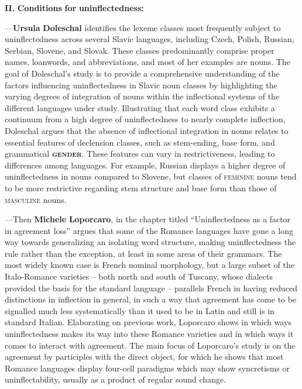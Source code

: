\documentclass[output=paper]{langscibook}
\begin{document}
\textbf{II.} \textbf{Conditions} \textbf{for} \textbf{uninflectedness:} 

—\textbf{Ursula} \textbf{Doleschal} identifies the lexeme classes most frequently subject to uninflectedness across several Slavic languages, including Czech, Polish, Russian, Serbian, Slovene, and Slovak. These classes predominantly comprise proper names, loanwords, and abbreviations, and most of her examples are nouns. The goal of Doleschal’s study is to provide a comprehensive understanding of the factors influencing uninflectedness in Slavic noun classes by highlighting the varying degrees of integration of nouns within the inflectional systems of the different languages under study. Illustrating that each word class exhibits a continuum from a high degree of uninflectedness to nearly complete inflection, Doleschal argues that the absence of inflectional integration in nouns relates to essential features of declension classes, such as stem-ending, base form, and grammatical \textbf{\textsc{gender}}. These features can vary in restrictiveness, leading to differences among languages. For example, Russian displays a higher degree of uninflectedness in nouns compared to Slovene, but classes of \textsc{feminine} nouns tend to be more restrictive regarding stem structure and base form than those of \textsc{masculine} nouns. 

—Then \textbf{Michele} \textbf{Loporcaro}, in the chapter titled “Uninflectedness as a factor in agreement loss” argues that some of the Romance languages have gone a long way towards generalizing an isolating word structure, making uninflectedness the rule rather than the exception, at least in some areas of their grammars. The most widely known case is French nominal morphology, but a large subset of the Italo-Romance varieties – both north and south of Tuscany, whose dialects provided the basis for the standard language – parallels French in having reduced distinctions in inflection in general, in such a way that agreement has come to be signalled much less systematically than it used to be in Latin and still is in standard Italian. Elaborating on previous work, Loporcaro shows in which ways uninflectedness makes its way into these Romance varieties and in which ways it comes to interact with agreement. The main focus of Loporcaro’s study is on the agreement by participles with the direct object, for which he shows that most Romance languages display four-cell paradigms which may show syncretisms or uninflectability, usually as a product of regular sound change. 
\end{document}
